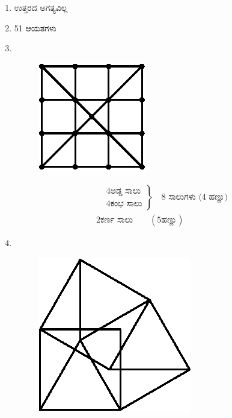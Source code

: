 \begin{enumerate}
\item ಉತ್ತರದ ಅಗತ್ಯವಿಲ್ಲ 

\item 51 ಆಯತಗಳು 

\item 
~

\begin{minipage}[c]{4cm}
\begin{figure}[H]
\centering
\includegraphics{images/chap12/ans20.eps}
\end{figure}
\end{minipage}
\begin{minipage}[c]{5cm}
\begin{align*}
& \left.
\begin{aligned}
& 4 \text{ಅಡ್ಡ ಸಾಲು} \\
& 4 \text{ಕಂಭ ಸಾಲು} 
\end{aligned}
\right\}
\quad\text{$8$ ಸಾಲುಗಳು ($4$ ಹಣ್ಣು)}\\
& 2 \text{ಕರ್ಣ ಸಾಲು} \qquad(5 \text{ಹಣ್ಣು})
\end{align*}
\end{minipage}

\smallskip

\item 
~

\begin{figure}[H]
\centering
\includegraphics[scale=1.1]{images/chap12/ans21.eps}
\end{figure}


\end{enumerate}
